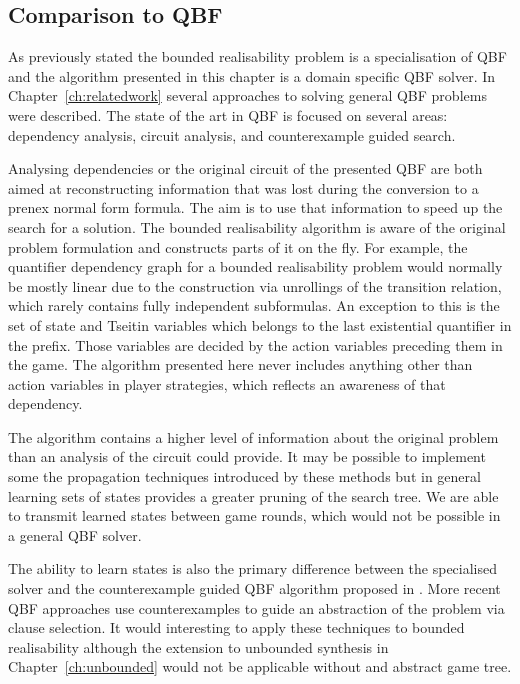 \subsection{Comparison to QBF}

As previously stated the bounded realisability problem is a specialisation of QBF and the algorithm presented in this chapter is a domain specific QBF solver. In Chapter~\ref{ch:relatedwork} several approaches to solving general QBF problems were described. The state of the art in QBF is focused on several areas: dependency analysis, circuit analysis, and counterexample guided search. 

Analysing dependencies or the original circuit of the presented QBF are both aimed at reconstructing information that was lost during the conversion to a prenex normal form formula. The aim is to use that information to speed up the search for a solution. The bounded realisability algorithm is aware of the original problem formulation and constructs parts of it on the fly. For example, the quantifier dependency graph for a bounded realisability problem would normally be mostly linear due to the construction via unrollings of the transition relation, which rarely contains fully independent subformulas. An exception to this is the set of state and Tseitin variables which belongs to the last existential quantifier in the prefix. Those variables are decided by the action variables preceding them in the game. The algorithm presented here never includes anything other than action variables in player strategies, which reflects an awareness of that dependency. 

The algorithm contains a higher level of information about the original problem than an analysis of the circuit could provide. It may be possible to implement some the propagation techniques introduced by these methods but in general learning sets of states provides a greater pruning of the search tree. We are able to transmit learned states between game rounds, which would not be possible in a general QBF solver.

The ability to learn states is also the primary difference between the specialised solver and the counterexample guided QBF algorithm proposed in \cite{Janota12}. More recent QBF approaches use counterexamples to guide an abstraction of the problem via clause selection. It would interesting to apply these techniques to bounded realisability although the extension to unbounded synthesis in Chapter~\ref{ch:unbounded} would not be applicable without and abstract game tree.

